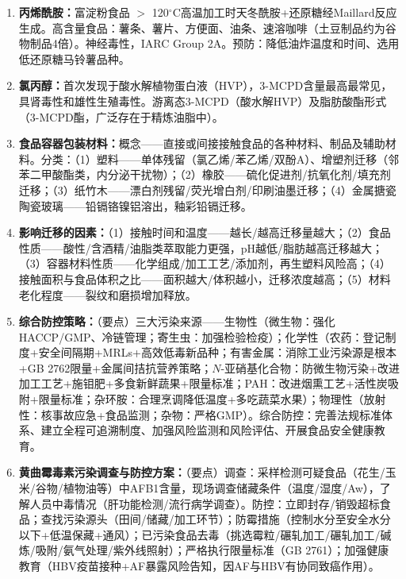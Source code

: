 {\begin{enumerate}[leftmargin=*, itemsep=6pt]
    \item \textbf{丙烯酰胺：}富淀粉食品 $>$ 120$^\circ$C高温加工时天冬酰胺+还原糖经Maillard反应生成。高含量食品：薯条、薯片、方便面、油条、速溶咖啡（土豆制品约为谷物制品4倍）。神经毒性，IARC Group 2A。预防：降低油炸温度和时间、选用低还原糖马铃薯品种。

    \item \textbf{氯丙醇：}首次发现于酸水解植物蛋白液（HVP），3-MCPD含量最高最常见，具肾毒性和雄性生殖毒性。游离态3-MCPD（酸水解HVP）及脂肪酸酯形式（3-MCPD酯，广泛存在于精炼油脂中）。

    \item \textbf{食品容器包装材料：}概念——直接或间接接触食品的各种材料、制品及辅助材料。分类：（1）塑料——单体残留（氯乙烯/苯乙烯/双酚A）、增塑剂迁移（邻苯二甲酸酯类，内分泌干扰物）；（2）橡胶——硫化促进剂/抗氧化剂/填充剂迁移；（3）纸竹木——漂白剂残留/荧光增白剂/印刷油墨迁移；（4）金属搪瓷陶瓷玻璃——铅镉铬镍铝溶出，釉彩铅镉迁移。

    \item \textbf{影响迁移的因素：}（1）接触时间和温度——越长/越高迁移量越大；（2）食品性质——酸性/含酒精/油脂类萃取能力更强，pH越低/脂肪越高迁移越大；（3）容器材料性质——化学组成/加工工艺/添加剂，再生塑料风险高；（4）接触面积与食品体积之比——面积越大/体积越小，迁移浓度越高；（5）材料老化程度——裂纹和磨损增加释放。

    \item \textbf{综合防控策略：}（要点）三大污染来源——生物性（微生物：强化HACCP/GMP、冷链管理；寄生虫：加强检验检疫）；化学性（农药：登记制度+安全间隔期+MRLs+高效低毒新品种；有害金属：消除工业污染源是根本+GB 2762限量+金属间拮抗营养策略；$N$-亚硝基化合物：防微生物污染+改进加工工艺+施钼肥+多食新鲜蔬果+限量标准；PAH：改进烟熏工艺+活性炭吸附+限量标准；杂环胺：合理烹调降低温度+多吃蔬菜水果）；物理性（放射性：核事故应急+食品监测；杂物：严格GMP）。综合防控：完善法规标准体系、建立全程可追溯制度、加强风险监测和风险评估、开展食品安全健康教育。

    \item \textbf{黄曲霉毒素污染调查与防控方案：}（要点）调查：采样检测可疑食品（花生/玉米/谷物/植物油等）中AFB1含量，现场调查储藏条件（温度/湿度/Aw），了解人员中毒情况（肝功能检测/流行病学调查）。防控：立即封存/销毁超标食品；查找污染源头（田间/储藏/加工环节）；防霉措施（控制水分至安全水分以下+低温保藏+通风）；已污染食品去毒（挑选霉粒/碾轧加工/碾轧加工/碱炼/吸附/氨气处理/紫外线照射）；严格执行限量标准（GB 2761）；加强健康教育（HBV疫苗接种+AF暴露风险告知，因AF与HBV有协同致癌作用）。
\end{enumerate}

}
\newpage
